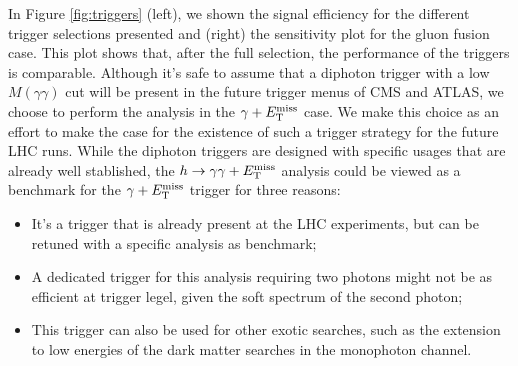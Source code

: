 In Figure \ref{fig:triggers} (left), we shown the signal efficiency for the different trigger selections presented and (right) the sensitivity plot for the gluon fusion case.
This plot shows that, after the full selection, the performance of the triggers is comparable. Although it's safe to assume that a diphoton trigger with a low $M(\gamma\gamma)$ cut will be present in the future trigger menus of CMS and ATLAS, we choose to perform the analysis in the $\gamma+E_{\mathrm{T}}^{\text{miss}}$ case. We make this choice as an effort to make the case for the existence of such a trigger strategy for the future LHC runs. While the diphoton triggers are designed with specific usages that are already well stablished, the $h\rightarrow\gamma\gamma+E_{\mathrm{T}}^{\text{miss}}$ analysis could be viewed as a benchmark for the $\gamma+E_{\mathrm{T}}^{\text{miss}}$ trigger for three reasons:
\begin{itemize}
    \item It's a trigger that is already present at the LHC experiments, but can be retuned with a specific analysis as benchmark;
    \item A dedicated trigger for this analysis requiring two photons might not be as efficient at trigger legel, given the soft spectrum of the second photon;
    \item This trigger can also be used for other exotic searches, such as the extension to low energies of the dark matter searches in the monophoton channel.
\end{itemize}

